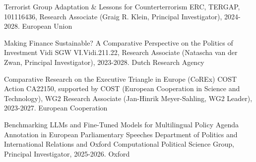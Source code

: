 





\vspace{1mm}

\begin{cvhonors}
\cvhonor
{Terrorist Group Adaptation \& Lessons for Counterterrorism}
{ERC, TERGAP, 101116436, Research Associate (Graig R. Klein, Principal Investigator), 2024-2028.}
{European Union}
{\faPlayCircle}
\end{cvhonors}

\vspace{1mm}

\begin{cvhonors}
\cvhonor
{Making Finance Sustainable? A Comparative Perspective on the Politics of Investment}
{Vidi SGW VI.Vidi.211.22, Research Associate (Natascha van der Zwan, Principal Investigator), 2023-2028.} %
{Dutch Research Agency}
{\faPlayCircle}
\end{cvhonors}

\vspace{1mm}

\begin{cvhonors}
\cvhonor
{Comparative Research on the Executive Triangle in Europe (CoREx)}
{COST Action CA22150, supported by COST (European Cooperation in Science and Technology), WG2 Research Associate (Jan-Hinrik Meyer-Sahling, WG2 Leader), 2023-2027.}
{European Cooperation}
{\faPlayCircle}
\end{cvhonors}

\vspace{1mm}

\begin{cvhonors}
\cvhonor
{Benchmarking LLMs and Fine-Tuned Models for Multilingual Policy Agenda Annotation in European Parliamentary Speeches}
{Department of Politics and International Relations and Oxford Computational Political Science Group, Principal Investigator, 2025-2026.}
{Oxford}
{\faPlayCircle}
\end{cvhonors}

